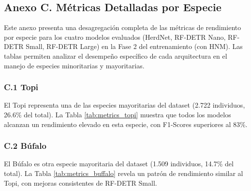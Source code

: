 \FloatBarrier

\subsection*{Anexo C. Métricas Detalladas por Especie}

Este anexo presenta una desagregación completa de las métricas de rendimiento por especie para los cuatro modelos evaluados (HerdNet, RF-DETR Nano, RF-DETR Small, RF-DETR Large) en la Fase 2 del entrenamiento (con HNM). Las tablas permiten analizar el desempeño específico de cada arquitectura en el manejo de especies minoritarias y mayoritarias.

\subsubsection*{C.1 Topi}

El Topi representa una de las especies mayoritarias del dataset (2.722 individuos, 26.6\% del total). La Tabla \ref{tab:metrics_topi} muestra que todos los modelos alcanzan un rendimiento elevado en esta especie, con F1-Scores superiores al 83\%.

\begin{table}[ht]
\centering
\caption{Métricas de rendimiento para la especie Topi (Fase 2).}
\label{tab:metrics_topi}
\end{table}

\subsubsection*{C.2 Búfalo}

El Búfalo es otra especie mayoritaria del dataset (1.509 individuos, 14.7\% del total). La Tabla \ref{tab:metrics_buffalo} revela un patrón de rendimiento similar al Topi, con mejoras consistentes de RF-DETR Small.

